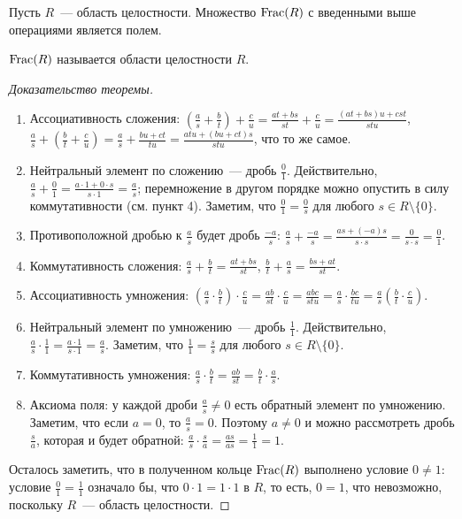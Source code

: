\begin{theorem}
Пусть $R$~--- область целостности.
Множество $\operatorname{Frac}(R)$ с введенными выше операциями является полем.
\end{theorem}
\begin{definition}
$\operatorname{Frac}(R)$ называется  области целостности $R$.
\end{definition}
\begin{proof}[Доказательство теоремы]
\begin{enumerate}
\item Ассоциативность сложения:
  $(\frac{a}{s}+\frac{b}{t})+\frac{c}{u}=\frac{at+bs}{st}+\frac{c}{u}=\frac{(at+bs)u+cst}{stu}$,
  $\frac{a}{s}+(\frac{b}{t}+\frac{c}{u})=\frac{a}{s}+\frac{bu+ct}{tu}=\frac{atu+(bu+ct)s}{stu}$,
  что то же самое.
\item Нейтральный элемент по сложению~--- дробь
  $\frac{0}{1}$. Действительно, $\frac{a}{s}+\frac{0}{1}=\frac{a\cdot
    1+0\cdot s}{s\cdot 1}=\frac{a}{s}$; перемножение в другом порядке
  можно опустить в силу коммутативности (см. пункт 4). Заметим, что
  $\frac{0}{1}=\frac{0}{s}$ для любого $s\in R\setminus\{0\}$.
\item Противоположной дробью к $\frac{a}{s}$ будет дробь
  $\frac{-a}{s}$:
  $\frac{a}{s}+\frac{-a}{s}=\frac{as+(-a)s}{s\cdot s}=\frac{0}{s\cdot s}=\frac{0}{1}$.
\item Коммутативность сложения:
  $\frac{a}{s}+\frac{b}{t}=\frac{at+bs}{st}$,
  $\frac{b}{t}+\frac{a}{s}=\frac{bs+at}{st}$.
\item Ассоциативность умножения:
  $(\frac{a}{s}\cdot\frac{b}{t})\cdot\frac{c}{u}
=\frac{ab}{st}\cdot\frac{c}{u}=\frac{abc}{stu}=\frac{a}{s}\cdot\frac{bc}{tu}
=\frac{a}{s}(\frac{b}{t}\cdot\frac{c}{u})$.
\item Нейтральный элемент по умножению~--- дробь
  $\frac{1}{1}$. Действительно,
  $\frac{a}{s}\cdot\frac{1}{1}=\frac{a\cdot 1}{s\cdot
    1}=\frac{a}{s}$. Заметим, что $\frac{1}{1}=\frac{s}{s}$ для любого
  $s\in R\setminus\{0\}$.
\item Коммутативность умножения:
  $\frac{a}{s}\cdot\frac{b}{t}=\frac{ab}{st}
=\frac{b}{t}\cdot\frac{a}{s}$.
\item Аксиома поля: у каждой дроби $\frac{a}{s}\neq 0$ есть обратный
  элемент по умножению. Заметим, что если $a=0$, то
  $\frac{a}{s}=0$. Поэтому $a\neq 0$ и можно рассмотреть дробь
  $\frac{s}{a}$, которая и будет обратной:
  $\frac{a}{s}\cdot\frac{s}{a}=\frac{as}{as}=\frac{1}{1}=1$.
\end{enumerate}
Осталось заметить, что в полученном кольце $\operatorname{Frac}(R)$ выполнено
условие $0\neq 1$: условие $\frac{0}{1}=\frac{1}{1}$ означало бы, что
$0\cdot 1=1\cdot 1$ в $R$, то есть, $0=1$, что невозможно, поскольку
$R$~--- область целостности.
\end{proof}

